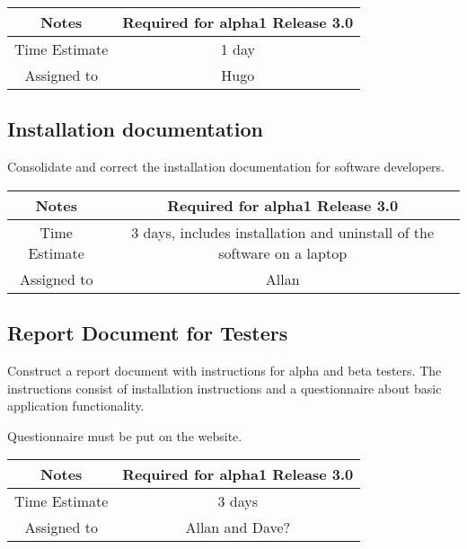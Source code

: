 \documentclass[12pt]{article}
\begin{document}
{
  \vspace{5mm}
  \centering
  \begin{tabular}{|c|c|}
    \hline
    Notes
    & Required for alpha1 Release 3.0 \\
    \hline
    Time Estimate
    & 1 day \\
    \hline
    Assigned to
    & Hugo \\
    \hline
  \end{tabular}
}



\subsection{Installation documentation}

Consolidate and correct the installation documentation for software
developers.

{
  \vspace{5mm}
  \centering
  \begin{tabular}{|c|c|}
    \hline
    Notes
    & Required for alpha1 Release 3.0 \\
    \hline
    Time Estimate
    & 3 days, includes installation and uninstall of the software on a laptop \\
    \hline
    Assigned to
    & Allan \\
    \hline
  \end{tabular}
}



\subsection{Report Document for Testers}

Construct a report document with instructions for alpha and beta
testers.  The instructions consist of installation instructions and a
questionnaire about basic application functionality.

Questionnaire must be put on the website.


{
  \vspace{5mm}
  \centering
  \begin{tabular}{|c|c|}
    \hline
    Notes
    & Required for alpha1 Release 3.0 \\
    \hline
    Time Estimate
    & 3 days \\
    \hline
    Assigned to
    &  Allan and Dave? \\
    \hline
  \end{tabular}
}
\end{document}
